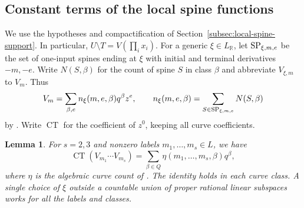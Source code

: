 \documentclass[11pt,reqno]{amsart}
\numberwithin{equation}{section}
\newtheorem{lemma}[theorem]{Lemma}
\theoremstyle{definition}
\theoremstyle{remark}
\begin{document}
\subsection{Constant terms of the local spine functions}
\label{subsec:local-zero-trace}

We use the hypotheses and compactification of
Section~\ref{subsec:local-spine-support}. In particular,
\(U\setminus T=V(\prod_i x_i)\). For a generic \(\xi\in L_{\mathbb R}\),
let \({\rm SP}_{\xi,m,e}\) be the set of one-input spines ending at
\(\xi\) with initial and terminal derivatives \(-m,-e\). Write \(N(S,\beta)\)
for the count of spine \(S\) in class \(\beta\) and abbreviate
\(V_{\xi,m}\) to \(V_m\). Thus
\[ V_m=\sum_{\beta,e} n_{\xi}(m,e,\beta)q^\beta z^e,\qquad n_{\xi}(m,e,\beta)=\sum_{S\in{\rm SP}_{\xi,m,e}}N(S,\beta) \]
by \cite[Definition~20.20]{KY}. Write \(\operatorname{CT}\) for the
coefficient of \(z^0\), keeping all curve coefficients.

\begin{lemma}\label{lem:local-zero-trace}
For \(s=2,3\) and nonzero labels \(m_1,\ldots,m_s\in L\), we have
\begin{equation}\label{eq:local-constant-term-trace}
\operatorname{CT}(V_{m_1}\cdots V_{m_s}) =\sum_{\beta\in Q}\eta(m_1,\ldots,m_s,\beta)q^\beta,
\end{equation}
where \(\eta\) is the algebraic curve count of \cite[Definition~1.1]{KY}.
The identity holds in each curve class. A single choice of \(\xi\) outside
a countable union of proper rational linear subspaces works for all
the labels and classes.
\end{lemma}
\end{document}
